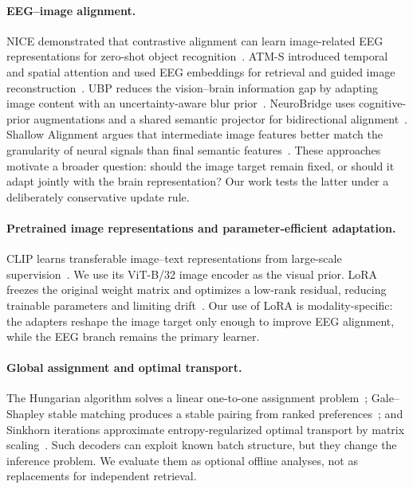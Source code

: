 \documentclass{article}
\begin{document}
\paragraph{EEG--image alignment.}
NICE demonstrated that contrastive alignment can learn image-related EEG representations for zero-shot object recognition~\citep{song2024nice}. ATM-S introduced temporal and spatial attention and used EEG embeddings for retrieval and guided image reconstruction~\citep{li2024visual}. UBP reduces the vision--brain information gap by adapting image content with an uncertainty-aware blur prior~\citep{wu2025ubp}. NeuroBridge uses cognitive-prior augmentations and a shared semantic projector for bidirectional alignment~\citep{zhang2026neurobridge}. Shallow Alignment argues that intermediate image features better match the granularity of neural signals than final semantic features~\citep{du2026shallow}. These approaches motivate a broader question: should the image target remain fixed, or should it adapt jointly with the brain representation? Our work tests the latter under a deliberately conservative update rule.

\paragraph{Pretrained image representations and parameter-efficient adaptation.}
CLIP learns transferable image--text representations from large-scale supervision~\citep{radford2021clip}. We use its ViT-B/32 image encoder as the visual prior. LoRA freezes the original weight matrix and optimizes a low-rank residual, reducing trainable parameters and limiting drift~\citep{hu2022lora}. Our use of LoRA is modality-specific: the adapters reshape the image target only enough to improve EEG alignment, while the EEG branch remains the primary learner.

\paragraph{Global assignment and optimal transport.}
The Hungarian algorithm solves a linear one-to-one assignment problem~\citep{kuhn1955hungarian}; Gale--Shapley stable matching produces a stable pairing from ranked preferences~\citep{gale1962college}; and Sinkhorn iterations approximate entropy-regularized optimal transport by matrix scaling~\citep{sinkhorn1967concerning,cuturi2013sinkhorn}. Such decoders can exploit known batch structure, but they change the inference problem. We evaluate them as optional offline analyses, not as replacements for independent retrieval.
\end{document}
